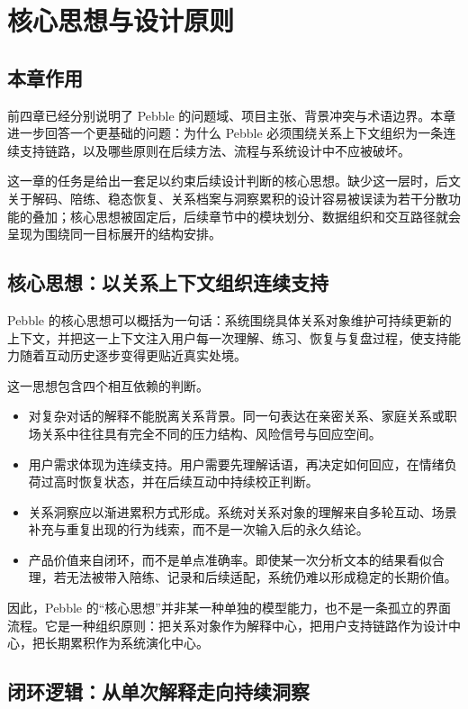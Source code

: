 \chapter{核心思想与设计原则}

\section{本章作用}

前四章已经分别说明了 Pebble 的问题域、项目主张、背景冲突与术语边界。本章进一步回答一个更基础的问题：为什么 Pebble 必须围绕关系上下文组织为一条连续支持链路，以及哪些原则在后续方法、流程与系统设计中不应被破坏。

这一章的任务是给出一套足以约束后续设计判断的核心思想。缺少这一层时，后文关于解码、陪练、稳态恢复、关系档案与洞察累积的设计容易被误读为若干分散功能的叠加；核心思想被固定后，后续章节中的模块划分、数据组织和交互路径就会呈现为围绕同一目标展开的结构安排。

\section{核心思想：以关系上下文组织连续支持}

Pebble 的核心思想可以概括为一句话：系统围绕具体关系对象维护可持续更新的上下文，并把这一上下文注入用户每一次理解、练习、恢复与复盘过程，使支持能力随着互动历史逐步变得更贴近真实处境。

这一思想包含四个相互依赖的判断。

\begin{itemize}
  \item 对复杂对话的解释不能脱离关系背景。同一句表达在亲密关系、家庭关系或职场关系中往往具有完全不同的压力结构、风险信号与回应空间。
  \item 用户需求体现为连续支持。用户需要先理解话语，再决定如何回应，在情绪负荷过高时恢复状态，并在后续互动中持续校正判断。
  \item 关系洞察应以渐进累积方式形成。系统对关系对象的理解来自多轮互动、场景补充与重复出现的行为线索，而不是一次输入后的永久结论。
  \item 产品价值来自闭环，而不是单点准确率。即使某一次分析文本的结果看似合理，若无法被带入陪练、记录和后续适配，系统仍难以形成稳定的长期价值。
\end{itemize}

因此，Pebble 的“核心思想”并非某一种单独的模型能力，也不是一条孤立的界面流程。它是一种组织原则：把关系对象作为解释中心，把用户支持链路作为设计中心，把长期累积作为系统演化中心。

\section{闭环逻辑：从单次解释走向持续洞察}

